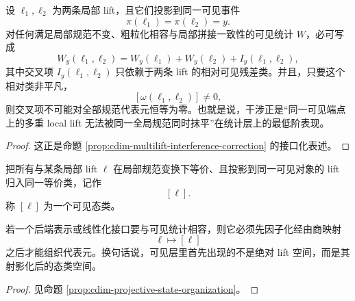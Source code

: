 \begin{proposition}[干涉的最小结构]\label{prop:typed-address-biaxial-completion-minimal-interference}
设 \(\ell_1,\ell_2\) 为两条局部 lift，且它们投影到同一可见事件
\[
\pi(\ell_1)=\pi(\ell_2)=y.
\]
对任何满足局部规范不变、粗粒化相容与局部拼接一致性的可见统计 \(W\)，必可写成
\[
W_y(\ell_1,\ell_2)=W_y(\ell_1)+W_y(\ell_2)+I_y(\ell_1,\ell_2),
\]
其中交叉项 \(I_y(\ell_1,\ell_2)\) 只依赖于两条 lift 的相对可见残差类。并且，只要这个相对类非平凡，
\[
[\omega(\ell_1,\ell_2)]\neq 0,
\]
则交叉项不可能对全部规范代表元恒等为零。也就是说，干涉正是“同一可见端点上的多重 local lift 无法被同一全局规范同时抹平”在统计层上的最低阶表现。
\end{proposition}
\begin{proof}
这正是命题 \ref{prop:cdim-multilift-interference-correction} 的接口化表述。
\end{proof}

\begin{definition}[可见态类]\label{def:typed-address-biaxial-completion-visible-state-class}
把所有与某条局部 lift \(\ell\) 在局部规范变换下等价、且投影到同一可见对象的 lift 归入同一等价类，记作
\[
[\ell].
\]
称 \([\ell]\) 为一个可见态类。
\end{definition}

\begin{proposition}[后端线性化必须先下降到射影类]\label{prop:typed-address-biaxial-completion-projective-organization}
若一个后端表示或线性化接口要与可见统计相容，则它必须先因子化经由商映射
\[
\ell\longmapsto [\ell]
\]
之后才能组织代表元。换句话说，可见层里首先出现的不是绝对 lift 空间，而是其射影化后的态类空间。
\end{proposition}
\begin{proof}
见命题 \ref{prop:cdim-projective-state-organization}。
\end{proof}

